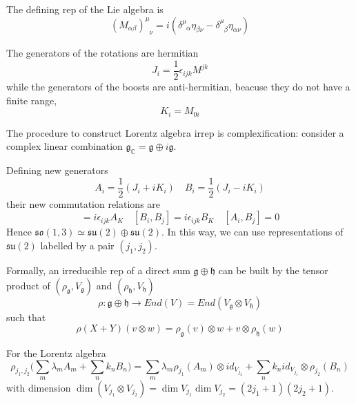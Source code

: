     The defining rep of the Lie algebra is 
    \begin{equation*}
        (M_{\alpha\beta})^\mu_{\phantom \mu \nu} = i (\delta^\mu_{\phantom \mu \alpha} \eta_{\beta \nu} - \delta^\mu_{\phantom \mu \beta} \eta_{\alpha \nu})
    \end{equation*}

    The generators of the rotations are hermitian
    \begin{equation*}
        J_i = \frac{1}{2} \epsilon_{ijk} M^{jk}
    \end{equation*}
    while the generators of the boosts are anti-hermitian, beacuse they do not have a finite range,
    \begin{equation*}
        K_i = M_{0i}
    \end{equation*}

    The procedure to construct Lorentz algebra irrep is complexification: consider a complex linear combination $\mathfrak g_{\mathbb C} = \mathfrak g \oplus i \mathfrak g$. 

    Defining new generators 
    \begin{equation*}
        A_i = \frac{1}{2} (J_i + i K_i) \quad B_i = \frac{1}{2} (J_i - i K_i)
    \end{equation*}
    their new commutation relations are 
    \begin{equation*}
        [A_i, A_j] = i \epsilon_{ijk} A_K \quad [B_i, B_j] = i \epsilon_{ijk} B_K \quad [A_i, B_j] = 0
    \end{equation*}
    Hence $\mathfrak{so}(1,3) \simeq \mathfrak{su}(2) \oplus \mathfrak{su}(2)$. In this way, we can use representations of $\mathfrak{su}(2)$ labelled by a pair $(j_1, j_2)$. 

    Formally, an irreducible rep of a direct sum $\mathfrak g \oplus \mathfrak h$ can be built by the tensor product of $(\rho_{\mathfrak g}, V_{\mathfrak g})$ and $(\rho_{\mathfrak h}, V_{\mathfrak h})$
    \begin{equation*}
        \rho \colon \mathfrak g \oplus \mathfrak h \rightarrow End(V) = End(V_{\mathfrak g} \otimes V_{\mathfrak h})
    \end{equation*}
    such that 
    \begin{equation*}
        \rho(X+Y) (v \otimes w) = \rho_{\mathfrak g}(v) \otimes w + v \otimes \rho_{\mathfrak h}(w)
    \end{equation*}

    For the Lorentz algebra 
    \begin{equation*}
        \rho_{j_1, j_2} \Big ( \sum_m \lambda_m A_m + \sum_n k_n B_n \Big) = \sum_m \lambda_m \rho_{j_1} (A_m) \otimes id_{V_{j_2}} + \sum_n k_n id_{V_{j_1}} \otimes \rho_{j_2} (B_n)
    \end{equation*}
    with dimension $\dim (V_{j_1} \otimes V_{j_2}) = \dim V_{j_1} \dim V_{j_2} = (2j_1 + 1)(2j_2 + 1)$.


